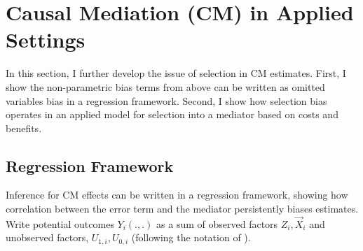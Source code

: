 \section{Causal Mediation (CM) in Applied Settings}
\label{sec:applied}
In this section, I further develop the issue of selection in CM estimates. First, I show the non-parametric bias terms from above can be written as omitted variables bias in a regression framework.
Second, I show how selection bias operates in an applied model for selection into a mediator based on costs and benefits.

\subsection{Regression Framework}
\label{sec:regression}
Inference for CM effects can be written in a regression framework, showing how correlation between the error term and the mediator persistently biases estimates.
Write potential outcomes $Y_i(., .)$ as a sum of observed factors $Z_i, \vec X_i$ and unobserved factors, $U_{1,i}, U_{0,i}$ (following the notation of \citealt{heckman2005structural}).

